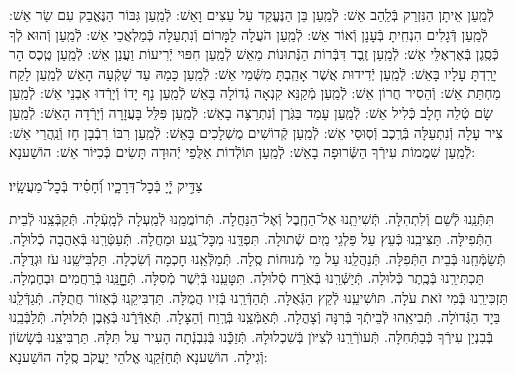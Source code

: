 \documentclass[twoside, openany, parskip=half, 11pt]{book}
\begin{document}
לְֿמַֽעַן אֵיתָן הַנִּזְרַק בְּֿלַֽהַב אֵשׁ: לְֿמַֽעַן בֵּן הַנֶּעֱקַד עַל עֵצִים וָאֵשׁ: לְֿמַֽעַן גִּבּוֹר הַנֶּאֱבַק עִם שַׂר אֵשׁ: לְֿמַֽעַן דְּֿגָלִים הִנְחִֽיתָ בְּֿעָנָן וְֿאוֹר אֵשׁ: לְֿמַֽעַן הֹעֲלָה לַמָּרוֹם וְֿנִתְעַלָּה כְּֿמַלְאֲכֵי אֵשׁ: לְֿמַֽעַן וְֿהוּא לְֿךָ כְּֿסֶֽגֶן בְּֿאֶרְאֶלֵּי אֵשׁ: לְֿמַֽעַן זֶֽבֶד דִּבְּֿרוֹת הַנְּֿתוּנוֹת מֵאֵשׁ לְֿמַֽעַן חִפּוּי יְֿרִיעוֹת וַעֲנַן אֵשׁ: לְֿמַֽעַן טֶֽכֶס הָר יָרַֽדְתָּ עָלָיו בָּאֵשׁ: לְֿמַֽעַן יְֿדִידוּת אֲשֶׁר אָהַֽבְתָּ מִשְּֿׁמֵי אֵשׁ: לְֿמַֽעַן כָּמַהּ עַד שָׁקְֿעָה הָאֵשׁ לְֿמַֽעַן לָקַח מַחְתַּת אֵשׁ: וְֿהֵסִיר חֲרוֹן אֵשׁ: לְֿמַֽעַן מְֿקַנֵּא קִנְאָה גְֿדוֹלָה בָּאֵשׁ לְֿמַֽעַן נָף יָדוֹ וְֿיָרְֿדוּ אַבְנֵי אֵשׁ: לְֿמַֽעַן שָׂם טְֿלֵה חָלָב כְּֿלִיל אֵשׁ: לְֿמַֽעַן עָמַד בַּגֹּֽרֶן וְֿנִתְרַצָּה בָאֵשׁ: לְֿמַֽעַן פִּלֵּל בָּעֲזָרָה וְֿיָרְֿדָה הָאֵשׁ: לְֿמַֽעַן צִיר עָלָה וְֿנִתְעַלָּה בְּֿרֶֽכֶב וְֿסֽוּסֵי אֵשׁ: לְֿמַֽעַן קְֿדוֹשִׁים מֻשְׁלָכִים בָּאֵשׁ: לְֿמַֽעַן רִבּוֹ רִבְֿבָן חָז וְֿנַֽהֲרֵי אֵשׁ:
לְֿמַֽעַן שִׁמֲמוֹת עִירְֿךָ הַשְּֿׂרוּפָה בָאֵשׁ:
לְֿמַֽעַן תּוֹלְֿדוֹת אַלֻּפֵי יְֿהוּדָה תָּשִׂים כְּֿכִיּוֹר אֵשׁ: הוֹשַׁענָא:

צַדִּ֣יק יְֿ֖יָ בְּֿכׇל־דְּרָכָ֑יו וְֿ֝חָסִ֗יד בְּֿכׇל־מַעֲשָֽׂיו׃

תִּתְּֿנֵֽנוּ לְֿשֵׁם וְֿלִתְהִלָּה.
תְּֿשִׁיתֵֽנוּ אֶל־הַחֶֽבֶל וְֿאֶל־הַנַּחֲלָה.
תְּֿרוֹמֲמֵֽנוּ לְֿמַֽעְלָה לְֿמָֽעְֿלָה.
תְּֿקַבְּֿצֵֽנוּ לְֿבֵית הַתְּֿפִילָּה.
תַּצִּיבֵֽנוּ כְּֿעֵץ עַל פַּלְגֵי מַֽיִם שְֿׁתוּלָה.
תִּפְדֵּֽנוּ מִכׇּל־נֶֽגַע וּמַחֲלָה.
תְּֿעַטְּֿרֵֽנוּ בְּֿאַהֲבָה כְֿלוּלָה.
תְּֿשַׂמְּֿחֵֽנוּ בְּֿבֵית הַתְּֿפִלָּה.
תְּֿנַהֲלֵֽנוּ עַל מֵי מְֿנוּחוֹת סֶֽלָה.
תְּֿמַלְּֿאֵֽנוּ חׇכְמָה וְֿשִׂכְלָה.
תַּלְבִּישֵֽׁנוּ עֹז וּגְדֻלָּה.
תַּכְתִּירֵֽנוּ בְּֿכֶֽתֶר כְּֿלוּלָה.
תְּֿיַשְּֿׁרֵֽנוּ בְּֿאֹֽרַח סְֿלוּלָה.
תִּטָּעֵֽנוּ בְּֿיֹֽשֶׁר מְֿסִלָּה.
תְּֿחׇׇׇׇָנֵּֽנוּ בְּֿרַחֲמִים וּבְחֶמְלָה.
תַּזְכִּירֵֽנוּ בְּֿמִי זֹאת עֹלָה.
תּוׂשִׁיעֵֽנוּ לְֿקֵץ הַגְּֿאֻלָּה.
תְּֿהַדְּֿרֵֽנוּ בְּֿזִיו הֲמֻלָּה.
תַּדְבִּיקֵֽנוּ כְּֿאֵזוֹר חֲתֻלָּה.
תְּֿגַדְּֿלֵֽנוּ בַּיָד הַגְּֿדוׂלָה.
תְּֿבִיאֵֽהוּ לְֿבֵיתְֿךָ בְּֿרִנָּה וְֿצָהֳלָה.
תְּֿאַמְּֿצֵֽנוּ בְּֿרֶֽוַח וְֿהַצָּלָה.
תְּֿאַדְּֿרְֵֿנוּ בְּֿאֶֽבֶן תְּֿלוּלָה.
תְּֿלַבְּֿבֵֽנוּ בְּֿבִנְיַן עִירְֿךָ כְּֿבַתְּֿחִלָּה.
תְּֿעוׂרְֿרֵֽנוּ לְֿצִיּוׂן בְּֿשִׁכְלוּלָהּ.
תְּֿזַכְֵּֿֿנוּ בְּֿנִבְנְֿתָה הָעִיר עַל תִּלָּהּ.
תַּרְבִּיצֵֽנוּ בְּֿשָׂשׂוֹן וְֿגִילָה.
הוֹשַׁענָא תְּֿחַזְּֿקֵֽנוּ אֱלֹהֵי יַעֲקֹב סֶֽלָה הוֹשַׁענָא:
\end{document}
